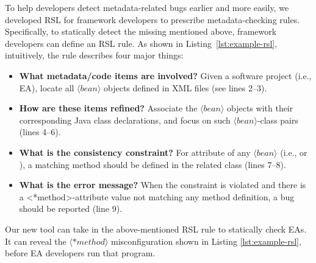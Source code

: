 To help developers detect metadata-related bugs earlier and more easily, we developed RSL for framework developers to prescribe metadata-checking rules. Specifically, to statically detect the missing  mentioned above, framework developers can define an RSL rule. As shown in Listing~\ref{lst:example-rsl},  %
intuitively, the rule describes four major things:  
\begin{itemize}
\item \textbf{What metadata/code items are involved?} Given a software project (i.e., EA), locate all $\langle bean\rangle$ objects defined in XML files (see lines 2--{3}).
\item \textbf{How are these items refined?} Associate the $\langle bean\rangle$ objects with their corresponding Java class declarations, and focus on such $\langle bean\rangle$-class pairs (lines {4}--6).
\item \textbf{What is the consistency constraint?} For attribute  of any $\langle bean\rangle$ (i.e.,  or ), a matching method should be 
defined in the related class (lines 7--8). 
\item \textbf{What is the error message?} When the constraint is violated and there is a <*method>-attribute value not matching any method definition, a bug should be reported (line 9). 
\end{itemize} 
Our new tool \tool can take in the above-mentioned RSL rule to statically check EAs. It can reveal the $\langle *method\rangle$  misconfiguration shown in Listing \ref{lst:example-rsl}, before EA developers run that program.